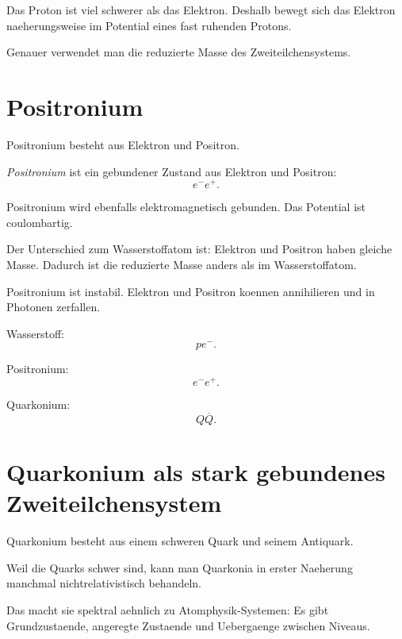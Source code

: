 \begin{notebox}
Das Proton ist viel schwerer als das Elektron.
Deshalb bewegt sich das Elektron naeherungsweise im Potential eines fast ruhenden
Protons.

Genauer verwendet man die reduzierte Masse des Zweiteilchensystems.
\end{notebox}

\section{Positronium}

Positronium besteht aus Elektron und Positron.

\begin{definitionbox}
\emph{Positronium} ist ein gebundener Zustand aus Elektron und Positron:
\[
    e^-e^+.
\]
\end{definitionbox}

\begin{conceptbox}
Positronium wird ebenfalls elektromagnetisch gebunden.
Das Potential ist coulombartig.

Der Unterschied zum Wasserstoffatom ist:
Elektron und Positron haben gleiche Masse.
Dadurch ist die reduzierte Masse anders als im Wasserstoffatom.
\end{conceptbox}

\begin{notebox}
Positronium ist instabil.
Elektron und Positron koennen annihilieren und in Photonen zerfallen.
\end{notebox}

\begin{examtipbox}
Wasserstoff:
\[
    p e^-.
\]

Positronium:
\[
    e^-e^+.
\]

Quarkonium:
\[
    Q\overline{Q}.
\]
\end{examtipbox}

\section{Quarkonium als stark gebundenes Zweiteilchensystem}

Quarkonium besteht aus einem schweren Quark und seinem Antiquark.

\begin{conceptbox}
Weil die Quarks schwer sind, kann man Quarkonia in erster Naeherung manchmal
nichtrelativistisch behandeln.

Das macht sie spektral aehnlich zu Atomphysik-Systemen:
Es gibt Grundzustaende, angeregte Zustaende und Uebergaenge zwischen Niveaus.
\end{conceptbox}

